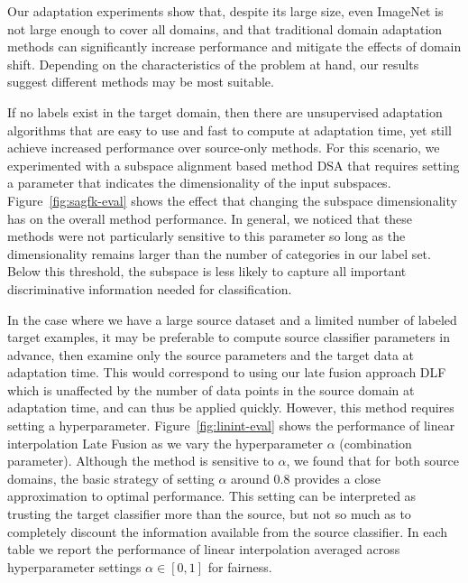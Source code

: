 Our adaptation experiments show that, despite its large size, even ImageNet is not large enough to cover all domains, and
that traditional domain adaptation methods can significantly increase performance and mitigate the effects of domain shift.
Depending on the characteristics of the problem at hand, our results suggest different methods may be most suitable.

If no labels exist in the target domain, then there are unsupervised adaptation algorithms that are easy to use and fast to compute at adaptation time, yet still achieve increased performance over source-only methods. 
For this scenario, we experimented with a subspace alignment based method DSA that requires setting a parameter that indicates the dimensionality of the input subspaces. 
Figure~\ref{fig:sagfk-eval} shows the effect that changing the subspace dimensionality has on the overall method performance. 
In general, we noticed that these methods were not particularly sensitive to this parameter so long as the dimensionality remains larger than the number of categories in our label set.
Below this threshold, the subspace is less likely to capture all important discriminative information needed for classification.

In the case where we have a large source dataset and a limited number of labeled target examples, it may be preferable to compute source classifier parameters in advance, then examine only the source parameters and the target data at adaptation time.
This would correspond to using our late fusion approach DLF which is unaffected by the number of data points in the source domain at adaptation time, and can thus be applied quickly.
However, this method requires setting a hyperparameter.
Figure~\ref{fig:linint-eval} shows the performance of linear interpolation Late Fusion as we vary the hyperparameter $\alpha$ (combination parameter).
Although the method is sensitive to $\alpha$, we found that for both source domains, the basic strategy of setting $\alpha$ around $0.8$ provides a close approximation to optimal performance. 
This setting can be interpreted as trusting the target classifier more than the source, but not so much as to completely discount the information available from the source classifier. In each table we report the performance of linear interpolation averaged across hyperparameter settings $\alpha \in [0,1]$ for fairness.

